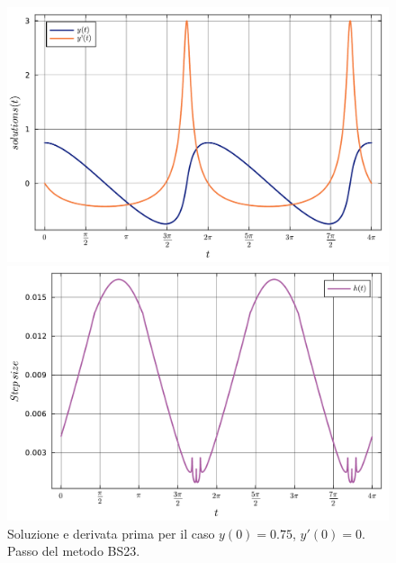\documentclass[letterpaper, 12pt]{article}
\numberwithin{equation}{section}    %
\begin{document}
\begin{figure}[!ht]
    \centering
    \begin{minipage}[b]{0.47\textwidth}
        \includegraphics[width=\textwidth]{6365.pdf}
    \end{minipage}
    \hspace{0.5cm}
    \begin{minipage}[b]{0.47\textwidth}
        \includegraphics[width=\textwidth]{6366.pdf}
    \end{minipage}
    \caption{Soluzione e derivata prima per il caso $y(0) = 0.75$, $y'(0) = 0$. Passo del metodo BS23.}
    \label{fig:es6_3_6_3}
\end{figure}
\end{document}

